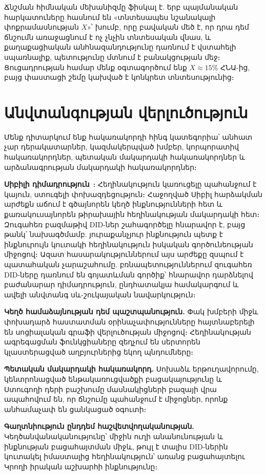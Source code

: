 \documentclass[11pt,a4paper,twocolumn]{article}
\begin{document}
Ճնշման հիմնական մեխանիզմը ֆիսկալ է. երբ պայմանական հարկատուները հասնում են «տնտեսապես նշանակալի փոքրամասնության $X$»՝ խումբ, որը բավական մեծ է, որ դրա դեմ ճնշումն առաջացնում է ոչ չնչին տնտեսական վնաս, և քաղաքացիական անհնազանդությունը դառնում է վստահելի սպառնալիք, պետությունը մտնում է բանակցության մեջ։ Ցուցադրության համար մենք օգտագործում ենք $X \approx 15\%$ ՀՆԱ-ից, բայց փաստացի շեմը կախված է կոնկրետ տնտեսությունից։

\section{Անվտանգության վերլուծություն}

Մենք դիտարկում ենք հակառակորդի հինգ կատեգորիա՝ անհատ չար դերակատարներ, կազմակերպված խմբեր, կորպորատիվ հակառակորդներ, պետական մակարդակի հակառակորդներ և արձանագրության մակարդակի հակառակորդներ։

\textbf{Սիբիլի դիմադրություն}~\cite{douceur2002}։ Հեղինակություն կառուցելը պահանջում է կայուն, ստուգելի փոխազդեցություն։ Հաջողված Սիբիլ հարձակման արժեքն աճում է գծայնորեն կեղծ ինքնությունների հետ և քառակուսայնորեն թիրախային հեղինակության մակարդակի հետ։ Զուգահեռ բազմաթիվ DID-ներ շահագործելը հնարավոր է, բայց թանկ՝ նախագծմամբ. յուրաքանչյուր ինքնություն պետք է ինքնուրույն կուտակի հեղինակություն իսկական գործունեության միջոցով։ Ազատ հասարակություններում այս արժեքը զսպում է պատահական չարաշահումը. բռնապետություններում զուգահեռ DID-ները դառնում են գոյատևման գործիք՝ հնարավոր դարձնելով բաժանարար դիմադրություն, ընդհատակյա համակարգում և ավելի անվտանգ սև-շուկայական նավարկություն։

\textbf{Կեղծ համաձայնության դեմ պաշտպանություն.} Փակ խմբերի միջև փոխադարձ հաստատման օրինաչափությունները հայտնաբերելի են սոցիալական գրաֆի վերլուծության միջոցով։ Հեղինակության ագրեգացման ֆունկցիաները զեղչում են սերտորեն կլաստերացված աղբյուրներից եկող պնդումները։

\textbf{Պետական մակարդակի հակառակորդ.} Սոխաձև երթուղավորումը, կենտրոնացված ենթակառուցվածքի բացակայությունը և Ստուգողի դերի բաշխումը մասնակիցների բազայի վրա ապահովում են, որ ճնշումը պահանջում է միջոցներ, որոնք անհամաչափ են ցանկացած օգուտի։

\textbf{Գաղտնիություն ընդդեմ հաշվետվողականության.} Կեղծանվանականությունը՝ միջին ուղի անանունության և ինքնության բացահայտման միջև, թույլ է տալիս DID-ներին կուտակել իմաստալից հեղինակություն՝ առանց բացահայտելու Կրողի իրական աշխարհի ինքնությունը։
\end{document}
